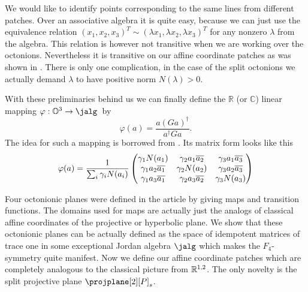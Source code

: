 We would like to identify points corresponding to the same lines from different patches. Over an associative algebra it is quite easy, because we can just use the equivalence relation $(x_1, x_2, x_3)^T \sim  (\lambda x_1, \lambda x_2,\lambda x_3)^T$ for any nonzero $\lambda$ from the algebra. This relation is however not transitive when we are working over the octonions. Nevertheless it is transitive on our affine coordinate patches as was shown in \cite{held_semi-riemannian_2009}. There is only one complication, in the case of the split octonions we actually demand $\lambda$ to have positive norm $N(\lambda) > 0$.

With these preliminaries behind us we can finally define the $\mathbb{R}$ (or $\mathbb{C}$) linear mapping $\varphi: \octo^3 \to \jalg $\ by
\[
	\varphi(a) = \frac{a(Ga)^\dagger}{a^\dagger Ga}.
\]
The idea for such a mapping is borrowed from \cite{allcock_identifying_1997, aslaksen_restricted_1991}. Its matrix form looks like this
\begin{equation}\label{eq:varphi}
\varphi(a) = \frac{1}{\sum\nolimits_i\gamma_i N(a_i)} 
	\begin{pmatrix}
		\gamma_1 N(a_1) & \gamma_2 a_1 \overline{a_2} & \gamma_3 a_1 \overline{a_3} \\
		\gamma_1 a_2\overline{a_1} & \gamma_2 N(a_2)  & \gamma_3 a_2 \overline{a_3} \\
		\gamma_1 a_3\overline{a_1} & \gamma_2 a_3 \overline{a_2} & \gamma_3 N(a_3) \\
	\end{pmatrix}
\end{equation}

Four octonionic planes were defined in the article \cite{held_semi-riemannian_2009} by giving maps and transition functions. The domains used for maps are actually just the analogs of classical affine coordinates of the projective or hyperbolic plane. We show that these octonionic planes can be actually defined as the space of idempotent matrices of trace one in some exceptional Jordan algebra $\jalg$ which makes the $F_4$-symmetry quite manifest. Now we define our affine coordinate patches which are completely analogous to the classical picture from $\mathbb{R}^{1,2}$. The only novelty is the split projective plane $\projplane[2][P]_s$.



